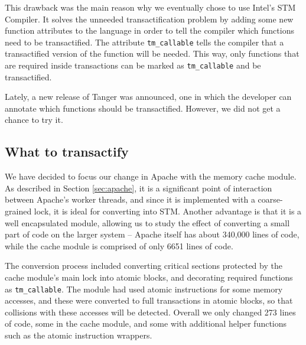 \documentclass[11pt]{sigplanconf}
\begin{document}
This drawback was the main reason why we eventually chose to use Intel's STM
Compiler. It solves the unneeded transactification problem by adding some new function attributes
to the language in order to tell the compiler which functions need to be transactified.
The attribute {\tt tm\_callable} tells the compiler that a transactified version
of the function will be needed. This way, only functions that are required inside
transactions can be marked as {\tt tm\_callable} and be transactified.

Lately, a new release of {\sc Tanger} was announced, one in which the developer
can annotate which functions should be transactified. However, we did not get a
chance to try it.

\subsection{What to transactify}
We have decided to focus our change in Apache with the memory cache module. As
described in Section \ref{sec:apache}, it is a significant point of interaction
between Apache's worker threads, and since it is implemented with a coarse-grained
lock, it is ideal for converting into STM. Another advantage is that it is a
well encapsulated module, allowing us to study the effect of converting a small 
part of code on the larger system -- Apache itself has about 340,000 lines of
code, while the cache module is comprised of only 6651 lines of code.

The conversion process included converting critical sections protected by the
cache module's main lock into atomic blocks, and decorating required functions
as {\tt tm\_callable}. The module had used atomic instructions for some memory
accesses, and these were converted to full transactions in atomic blocks, so
that collisions with these accesses will be detected. Overall we only changed
273 lines of code, some in the cache module, and some with additional helper
functions such as the atomic instruction wrappers.
\end{document}
